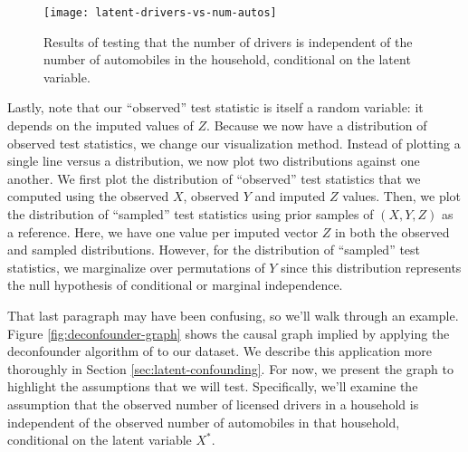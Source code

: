 \begin{figure}
   \centering
   \texttt{[image: latent-drivers-vs-num-autos]}
   \caption{Results of testing that the number of drivers is independent of the number of automobiles in the household, conditional on the latent variable.}
   \label{fig:latent-cit-results}
\end{figure}

Lastly, note that our ``observed'' test statistic is itself a random variable: it depends on the imputed values of $Z$.
Because we now have a distribution of observed test statistics, we change our visualization method.
Instead of plotting a single line versus a distribution, we now plot two distributions against one another.
We first plot the distribution of ``observed'' test statistics that we computed using the observed $X$, observed $Y$ and imputed $Z$ values.
Then, we plot the distribution of ``sampled'' test statistics using prior samples of $\left( X, Y, Z \right)$ as a reference.
Here, we have one value per imputed vector $Z$ in both the observed and sampled distributions.
However, for the distribution of ``sampled'' test statistics, we marginalize over permutations of $Y$ since this distribution represents the null hypothesis of conditional or marginal independence.

That last paragraph may have been confusing, so we'll walk through an example.
Figure \ref{fig:deconfounder-graph} shows the causal graph implied by applying the deconfounder algorithm of \citet{wang_2019_blessings} to our dataset.
We describe this application more thoroughly in Section \ref{sec:latent-confounding}.
For now, we present the graph to highlight the assumptions that we will test.
Specifically, we'll examine the assumption that the observed number of licensed drivers in a household is independent of the observed number of automobiles in that household, conditional on the latent variable $X^{*}$.

